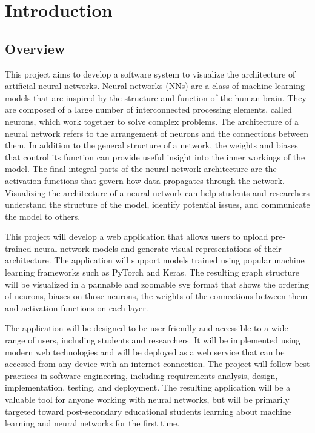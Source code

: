 \section{Introduction}
\label{sec:Introduction}

\subsection{Overview} 
This project aims to develop a software system to visualize the architecture of artificial neural networks. Neural networks (NNs) are a class of machine learning models that are inspired by the structure and function of the human brain. They are composed of a large number of interconnected processing elements, called neurons, which work together to solve complex problems. The architecture of a neural network refers to the arrangement of neurons and the connections between them. In addition to the general structure of a network, the weights and biases that control its function can provide useful insight into the inner workings of the model. The final integral parts of the neural network architecture are the activation functions that govern how data propagates through the network. Visualizing the architecture of a neural network can help students and researchers understand the structure of the model, identify potential issues, and communicate the model to others. 

This project will develop a web application that allows users to upload pre-trained neural network models and generate visual representations of their architecture. The application will support models trained using popular machine learning frameworks such as PyTorch and Keras. The resulting graph structure will be visualized in a pannable and zoomable svg format that shows the ordering of neurons, biases on those neurons, the weights of the connections between them and activation functions on each layer.

The application will be designed to be user-friendly and accessible to a wide range of users, including students and researchers. It will be implemented using modern web technologies and will be deployed as a web service that can be accessed from any device with an internet connection. The project will follow best practices in software engineering, including requirements analysis, design, implementation, testing, and deployment. The resulting application will be a valuable tool for anyone working with neural networks, but will be primarily targeted toward post-secondary educational students learning about machine learning and neural networks for the first time.

